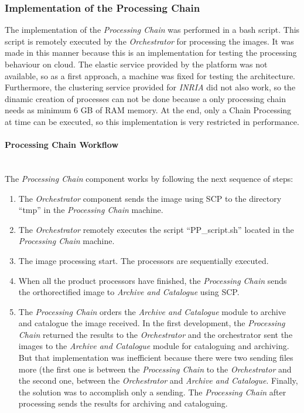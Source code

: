 \subsubsection{Implementation of the Processing Chain}

The implementation of the \emph{Processing Chain} was performed in a bash script. This script is remotely executed by the \emph{Orchestrator} for processing the
images. It was made in this manner because this is an implementation for testing the
processing behaviour on cloud. The elastic service provided by the \bonfire
platform was not available, so as a first approach, a machine was fixed for
testing the architecture.\\
 Furthermore, the clustering service provided for
\emph{INRIA} did not also work, so the dinamic creation of processes can not be
done because a only processing chain needs as minimum 6 GB of RAM memory. At the
end, only a Chain Processing at time can be executed, so this implementation is
very restricted in performance. 

\paragraph{Processing Chain Workflow}~\\

The \emph{Processing Chain} component works by following the next sequence of
steps:

\begin{enumerate}
\item The \emph{Orchestrator} component sends the image using \ac{SCP} to the
  directory ``tmp'' in the \emph{Processing Chain} machine.
\item The \emph{Orchestrator} remotely executes the script ``PP\_script.sh''
  located in the \emph{Processing Chain} machine.
\item The image processing start. The processors are sequentially executed.
\item When all the product processors have finished, the \emph{Processing Chain}
  sends the orthorectified image to \emph{Archive and Catalogue} using
  \ac{SCP}. 
\item The \emph{Processing Chain} orders the \emph{Archive and Catalogue} module
 to archive and catalogue the image received. In the first development, the
 \emph{Processing Chain} returned the results to the \emph{Orchestrator} and the
 orchestrator sent the images to the \emph{Archive and Catalogue} module for cataloguing
 and archiving. But that implementation was inefficient because there were two
 sending files more (the first one is between the \emph{Processing Chain} to the
 \emph{Orchestrator} and the second one, between the \emph{Orchestrator} and
 \emph{Archive and Catalogue}. Finally, the solution was to
 accomplish only a sending. The \emph{Processing Chain} after processing sends
 the results for archiving and cataloguing. 
\end{enumerate}

